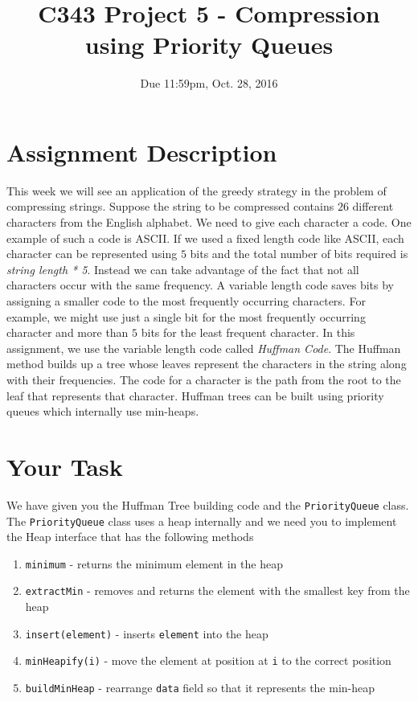 \documentclass[12pt]{article}
\title{C343 Project 5 - Compression using Priority Queues}
\date{Due 11:59pm, Oct. 28, 2016}
\begin{document}
\maketitle

\section{Assignment Description}

This week we will see an application of the greedy strategy in the
problem of compressing strings. Suppose the string to be compressed
contains $26$ different characters from the English alphabet. We need
to give each character a code. One example of such a code is ASCII. If
we used a fixed length code like ASCII, each character can be
represented using $5$ bits and the total number of bits required is
\emph{string length * 5}. Instead we can take advantage of the fact
that not all characters occur with the same frequency. A variable
length code saves bits by assigning a smaller code to the most
frequently occurring characters. For example, we might use just a
single bit for the most frequently occurring character and more than
$5$ bits for the least frequent character. In this assignment, we use
the variable length code called \emph{Huffman Code}. The Huffman
method builds up a tree whose leaves represent the characters in the
string along with their frequencies. The code for a character is the
path from the root to the leaf that represents that character. Huffman
trees can be built using priority queues which internally use
min-heaps.

\section{Your Task}

We have given you the Huffman Tree building code and the
\texttt{PriorityQueue} class. The \texttt{PriorityQueue} class uses a
heap internally and we need you to implement the Heap interface that has the following methods
\begin{enumerate}
\item \texttt{minimum} - returns the minimum element in the heap
\item \texttt{extractMin} - removes and returns the element with the smallest key from the heap
\item \texttt{insert(element)} - inserts \texttt{element} into the heap
\item \texttt{minHeapify(i)} - move the element at position at \texttt{i} to the correct position
\item \texttt{buildMinHeap} - rearrange \texttt{data} field so that it represents the min-heap
\end{enumerate}
\end{document}
